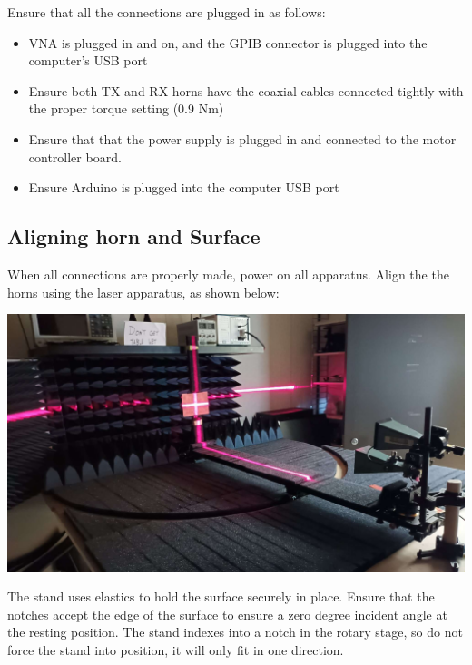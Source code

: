\documentclass[hidelinks]{article}
\begin{document}
Ensure that all the connections are plugged in as follows:\\
\begin{itemize}
    \item VNA is plugged in and on, and the GPIB connector is plugged into the computer's USB port
    \item Ensure both TX and RX horns have the coaxial cables connected tightly with the proper torque setting (0.9 Nm)
    \item Ensure that that the power supply is plugged in and connected to the motor controller board.
    \item Ensure Arduino is plugged into the computer USB port
\end{itemize}
\subsection{Aligning horn and Surface}
When all connections are properly made, power on all apparatus. Align the the horns using the laser apparatus, as shown below:
\begin{center}
    \includegraphics[width=\textwidth]{imgpsh_fullsize_anim (1).jpg}
\end{center}
The stand uses elastics to hold the surface securely in place. Ensure that the notches accept the edge of the surface to ensure a zero degree incident angle at the resting position. The stand indexes into a notch in the rotary stage, so do not force the stand into position, it will only fit in one direction.
\end{document}
